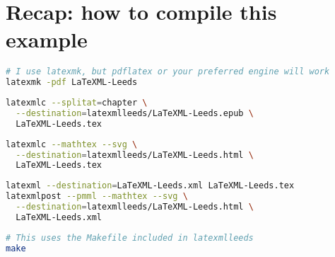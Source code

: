 \documentclass[a4paper]{article}
\theoremstyle{definition}
\begin{document}
\section{Recap: how to compile this example}
\begin{lstlisting}[language=bash,caption={Generate the PDF}]
# I use latexmk, but pdflatex or your preferred engine will work
latexmk -pdf LaTeXML-Leeds
\end{lstlisting}
\begin{lstlisting}[language=bash,caption={Generate the EPUB}]
latexmlc --splitat=chapter \
  --destination=latexmlleeds/LaTeXML-Leeds.epub \
  LaTeXML-Leeds.tex
\end{lstlisting}
\begin{lstlisting}[language=bash,caption={Generate the HTML}]
latexmlc --mathtex --svg \
  --destination=latexmlleeds/LaTeXML-Leeds.html \
  LaTeXML-Leeds.tex
\end{lstlisting}
\begin{lstlisting}[language=bash,caption={Generate the HTML in two steps}]
latexml --destination=LaTeXML-Leeds.xml LaTeXML-Leeds.tex
latexmlpost --pmml --mathtex --svg \
  --destination=latexmlleeds/LaTeXML-Leeds.html \
  LaTeXML-Leeds.xml
\end{lstlisting}
\begin{lstlisting}[language=bash,caption={Do all the above steps in one go}]
# This uses the Makefile included in latexmlleeds
make
\end{lstlisting}
\end{document}
